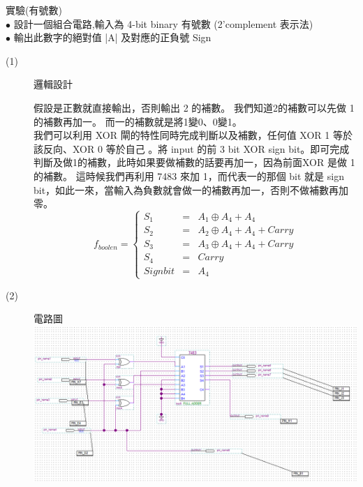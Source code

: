 \documentclass[12pt, a4paper]{article}
\begin{document}
\begin{description}
\begin{description}
        \fontsize{20}{22}\selectfont
        \item 實驗(有號數) \\[.3cm]
            \fontsize{16}{18}\selectfont
            $\bullet$ 設計一個組合電路,輸入為 4-bit binary 有號數 (2’complement 表示法)\\
            $\bullet$ 輸出此數字的絕對值 |A| 及對應的正負號 Sign 
            \begin{description}
              \item[(1)] 邏輯設計\\
                \begin{samepage}
                    假設是正數就直接輸出，否則輸出 2 的補數。
                    我們知道2的補數可以先做 1 的補數再加一。
                    而一的補數就是將1變0、0變1。\\
                    
                    我們可以利用 XOR 閘的特性同時完成判斷以及補數，任何值 XOR 1 等於該反向、XOR 0 等於自己
                    。將 input 的前 3 bit XOR sign bit。即可完成判斷及做1的補數，此時如果要做補數的話要再加一，因為前面XOR 是做 1 的補數。
                    這時候我們再利用 7483 來加 1，而代表一的那個 bit 就是 sign bit，如此一來，當輸入為負數就會做一的補數再加一，否則不做補數再加零。
                    $$ f_{boolen}=\left\{
                      \begin{aligned}
                      S_1 & = & A_1 \oplus A_4 + A_4 \\
                      S_2 & = & A_2 \oplus A_4 + A_4 + Carry \\
                      S_3 & = & A_3 \oplus A_4 + A_4 + Carry\\
                      S_4 & = & Carry \\
                      Sign bit & = & A_4
                      \end{aligned}
                      \right.
                      $$
                      
                  \end{samepage}
              \item[(2)] 電路圖\\[.3cm]
                \includegraphics[width=13cm]{./image/ex2.png} 
            \end{description}
        \normalsize    
      \end{description}



\end{description}
\end{document}
